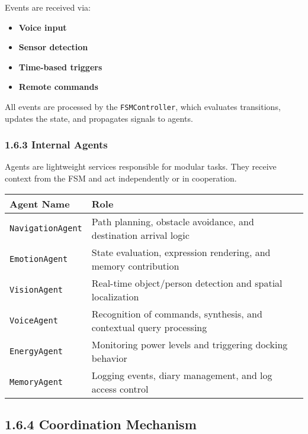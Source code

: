 Events are received via:

\begin{itemize}
    \item \textbf{Voice input}
    \item \textbf{Sensor detection}
    \item \textbf{Time-based triggers}
    \item \textbf{Remote commands}
\end{itemize}

All events are processed by the \texttt{FSMController}, which evaluates transitions, updates the state, and propagates signals to agents.

\vspace{0.5cm}

\subsubsection*{1.6.3 Internal Agents}

Agents are lightweight services responsible for modular tasks. They receive context from the FSM and act independently or in cooperation.

\vspace{0.3cm}
\begin{tabular}{|p{4cm}|p{9cm}|}
\hline
\textbf{Agent Name} & \textbf{Role} \\
\hline
\texttt{NavigationAgent} & Path planning, obstacle avoidance, and destination arrival logic \\
\texttt{EmotionAgent} & State evaluation, expression rendering, and memory contribution \\
\texttt{VisionAgent} & Real-time object/person detection and spatial localization \\
\texttt{VoiceAgent} & Recognition of commands, synthesis, and contextual query processing \\
\texttt{EnergyAgent} & Monitoring power levels and triggering docking behavior \\
\texttt{MemoryAgent} & Logging events, diary management, and log access control \\
\hline
\end{tabular}

\vspace{0.5cm}

\subsection*{1.6.4 Coordination Mechanism}


